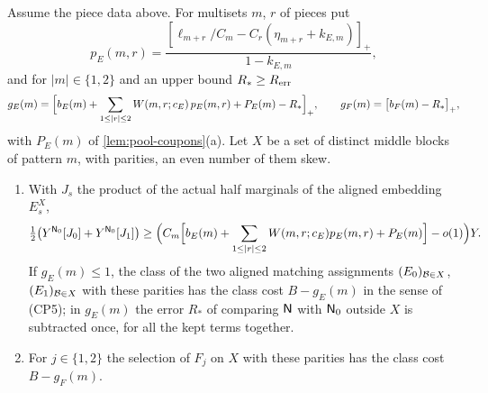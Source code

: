 \begin{proposition}
\label{prop:background-variance}
Assume the piece data above. For multisets $m$, $r$ of pieces put
\[
 p_E(m,r)=\frac{[\ell_{m+r}/C_m-C_r(\eta_{m+r}+k_{E,m})]_+}{1-k_{E,m}},
\]
and for $|m|\in\{1,2\}$ and an upper bound $R_*\ge R_{\rm err}$
\begin{equation}\label{eq:variance:background-gain}
 g_E(m)=\Bigl[b_E(m)+\sum_{1\le|r|\le2}W(m,r;c_E)\,p_E(m,r)+P_E(m)-R_*\Bigr]_+,
 \qquad g_F(m)=\bigl[b_F(m)-R_*\bigr]_+,
\end{equation}
with $P_E(m)$ of \cref{lem:pool-coupons}(a). Let $X$ be a set of distinct middle
blocks of pattern $m$, with parities, an even number of them skew.
\begin{enumerate}[label=(\alph*)]
\item With $J_s$ the product of the actual half marginals of the aligned
 embedding $E^X_s$,
 \[
  \tfrac12\bigl(Y^{\mathsf N_0}[J_0]+Y^{\mathsf N_0}[J_1]\bigr)\ge
  \Bigl(C_m\Bigl[b_E(m)+\sum_{1\le|r|\le2}W(m,r;c_E)p_E(m,r)+P_E(m)\Bigr]-o(1)\Bigr)Y .
 \]
 If $g_E(m)\le1$, the class of the two aligned matching assignments
 $(E_0)_{\mathcal B\in X}$, $(E_1)_{\mathcal B\in X}$ with these parities has the class cost
 $B-g_E(m)$ in the sense of (CP5); in $g_E(m)$ the error $R_*$ of comparing
 $\mathsf N$ with $\mathsf N_0$ outside $X$ is subtracted once, for all the
 kept terms together.
\item For $j\in\{1,2\}$ the selection of $F_j$ on $X$ with these parities has the
 class cost $B-g_F(m)$.
\end{enumerate}
\end{proposition}

